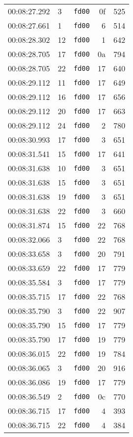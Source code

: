\documentclass{article}
\begin{document}
\begin{longtable}{lllrr}
00:08:27.292 & 3 & \texttt{fd00} & 0f & 525 \\
00:08:27.661 & 1 & \texttt{fd00} & 6 & 514 \\
00:08:28.302 & 12 & \texttt{fd00} & 1 & 642 \\
00:08:28.705 & 17 & \texttt{fd00} & 0a & 794 \\
00:08:28.705 & 22 & \texttt{fd00} & 17 & 640 \\
00:08:29.112 & 11 & \texttt{fd00} & 17 & 649 \\
00:08:29.112 & 16 & \texttt{fd00} & 17 & 656 \\
00:08:29.112 & 20 & \texttt{fd00} & 17 & 663 \\
00:08:29.112 & 24 & \texttt{fd00} & 2 & 780 \\
00:08:30.993 & 17 & \texttt{fd00} & 3 & 651 \\
00:08:31.541 & 15 & \texttt{fd00} & 17 & 641 \\
00:08:31.638 & 10 & \texttt{fd00} & 3 & 651 \\
00:08:31.638 & 15 & \texttt{fd00} & 3 & 651 \\
00:08:31.638 & 19 & \texttt{fd00} & 3 & 651 \\
00:08:31.638 & 22 & \texttt{fd00} & 3 & 660 \\
00:08:31.874 & 15 & \texttt{fd00} & 22 & 768 \\
00:08:32.066 & 3 & \texttt{fd00} & 22 & 768 \\
00:08:33.658 & 3 & \texttt{fd00} & 20 & 791 \\
00:08:33.659 & 22 & \texttt{fd00} & 17 & 779 \\
00:08:35.584 & 3 & \texttt{fd00} & 17 & 779 \\
00:08:35.715 & 17 & \texttt{fd00} & 22 & 768 \\
00:08:35.790 & 3 & \texttt{fd00} & 22 & 907 \\
00:08:35.790 & 15 & \texttt{fd00} & 17 & 779 \\
00:08:35.790 & 17 & \texttt{fd00} & 19 & 779 \\
00:08:36.015 & 22 & \texttt{fd00} & 19 & 784 \\
00:08:36.065 & 3 & \texttt{fd00} & 20 & 916 \\
00:08:36.086 & 19 & \texttt{fd00} & 17 & 779 \\
00:08:36.549 & 2 & \texttt{fd00} & 0c & 770 \\
00:08:36.715 & 17 & \texttt{fd00} & 4 & 393 \\
00:08:36.715 & 22 & \texttt{fd00} & 4 & 384 \\

\end{longtable}
\end{document}
